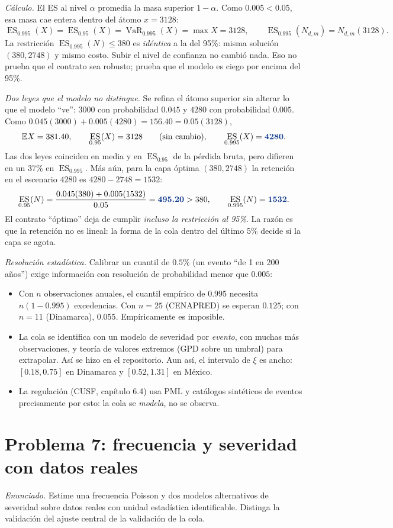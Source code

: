 \documentclass[11pt,reqno]{amsart}
\theoremstyle{definition}\newtheorem{definition}[theorem]{Definición}
\theoremstyle{remark}\newtheorem{remark}[theorem]{Observación}
\DeclareMathOperator{\VaR}{VaR}
\DeclareMathOperator{\ES}{ES}
\newcommand{\E}{\mathbb E}
\newcommand{\resultado}[1]{\ensuremath{{\color{resultblue}\boldsymbol{#1}}}}
\begin{document}
\emph{Cálculo.} El ES al nivel $\alpha$ promedia la masa superior $1-\alpha$. Como $0.005<0.05$, esa masa cae entera dentro del átomo $x=3128$:
\[
\ES_{0.995}(X)=\ES_{0.95}(X)=\VaR_{0.995}(X)=\max X=3128,
\qquad
\ES_{0.995}(N_{d,m})=N_{d,m}(3128).
\]
La restricción $\ES_{0.995}(N)\le380$ es \emph{idéntica} a la del 95\%: misma solución $(380,2748)$ y mismo costo. Subir el nivel de confianza no cambió nada. Eso no prueba que el contrato sea robusto; prueba que el modelo es ciego por encima del 95\%.

\emph{Dos leyes que el modelo no distingue.} Se refina el átomo superior sin alterar lo que el modelo ``ve'': $3000$ con probabilidad $0.045$ y $4280$ con probabilidad $0.005$. Como $0.045(3000)+0.005(4280)=156.40=0.05(3128)$,
\[
\E X=381.40,\qquad \ES_{0.95}(X)=3128\qquad\text{(sin cambio)},\qquad
\ES_{0.995}(X)=\resultado{4280}.
\]
Las dos leyes coinciden en media y en $\ES_{0.95}$ de la pérdida bruta, pero difieren en un 37\% en $\ES_{0.995}$. Más aún, para la capa óptima $(380,2748)$ la retención en el escenario $4280$ es $4280-2748=1532$:
\[
\ES_{0.95}(N)=\frac{0.045(380)+0.005(1532)}{0.05}=\resultado{495.20}>380,\qquad \ES_{0.995}(N)=\resultado{1532}.
\]
El contrato ``óptimo'' deja de cumplir \emph{incluso la restricción al 95\%}. La razón es que la retención no es lineal: la forma de la cola dentro del último 5\% decide si la capa se agota.

\emph{Resolución estadística.} Calibrar un cuantil de $0.5\%$ (un evento ``de 1 en 200 años'') exige información con resolución de probabilidad menor que $0.005$:
\begin{itemize}[leftmargin=2em]
\item Con $n$ observaciones anuales, el cuantil empírico de $0.995$ necesita $n(1-0.995)$ excedencias. Con $n=25$ (CENAPRED) se esperan $0.125$; con $n=11$ (Dinamarca), $0.055$. Empíricamente es imposible.
\item La cola se identifica con un modelo de severidad por \emph{evento}, con muchas más observaciones, y teoría de valores extremos (GPD sobre un umbral) para extrapolar. Así se hizo en el repositorio. Aun así, el intervalo de $\xi$ es ancho: $[0.18,0.75]$ en Dinamarca y $[0.52,1.31]$ en México.
\item La regulación (CUSF, capítulo 6.4) usa PML y catálogos sintéticos de eventos precisamente por esto: la cola se \emph{modela}, no se observa.
\end{itemize}

\section{Problema 7: frecuencia y severidad con datos reales}
\emph{Enunciado.} Estime una frecuencia Poisson y dos modelos alternativos de severidad sobre datos reales con unidad estadística identificable. Distinga la validación del ajuste central de la validación de la cola.
\end{document}
